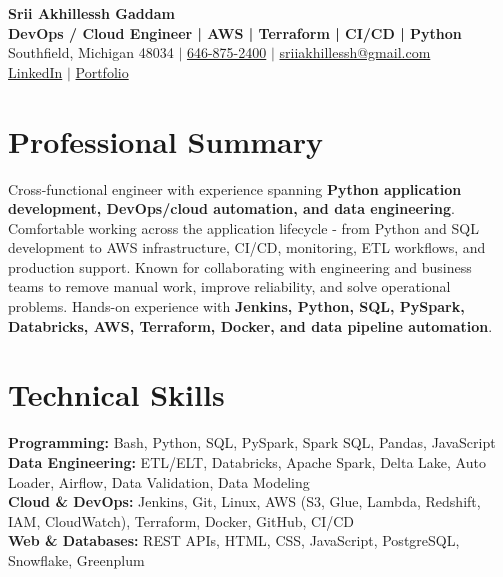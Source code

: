 \documentclass[letterpaper,10pt]{article}
\begin{document}
\fontsize{9.35pt}{10.45pt}\selectfont

\begin{center}
    {\LARGE \textbf{Srii Akhillessh Gaddam}} \\[-1pt]
    \textbf{DevOps / Cloud Engineer | AWS | Terraform | CI/CD | Python} \\[2pt]
    Southfield, Michigan 48034 $|$
    \href{tel:6468752400}{646-875-2400} $|$
    \href{mailto:sriiakhillessh@gmail.com}{sriiakhillessh@gmail.com} \\[1pt]
    \href{https://www.linkedin.com/in/srii-akhiilessh-gaddam-b48668191/}{LinkedIn} $|$
    \href{https://sriiakhillesshg.github.io/portfolio/}{Portfolio}
\end{center}
\vspace{-8pt}

\section{Professional Summary}
\small{Cross-functional engineer with experience spanning \textbf{Python application development, DevOps/cloud automation, and data engineering}. Comfortable working across the application lifecycle - from Python and SQL development to AWS infrastructure, CI/CD, monitoring, ETL workflows, and production support. Known for collaborating with engineering and business teams to remove manual work, improve reliability, and solve operational problems. Hands-on experience with \textbf{Jenkins, Python, SQL, PySpark, Databricks, AWS, Terraform, Docker, and data pipeline automation}.}

\section{Technical Skills}
\small{
\textbf{Programming:} Bash, Python, SQL, PySpark, Spark SQL, Pandas, JavaScript \\
\textbf{Data Engineering:} ETL/ELT, Databricks, Apache Spark, Delta Lake, Auto Loader, Airflow, Data Validation, Data Modeling \\
\textbf{Cloud \& DevOps:} Jenkins, Git, Linux, AWS (S3, Glue, Lambda, Redshift, IAM, CloudWatch), Terraform, Docker, GitHub, CI/CD \\
\textbf{Web \& Databases:} REST APIs, HTML, CSS, JavaScript, PostgreSQL, Snowflake, Greenplum
}
\end{document}
